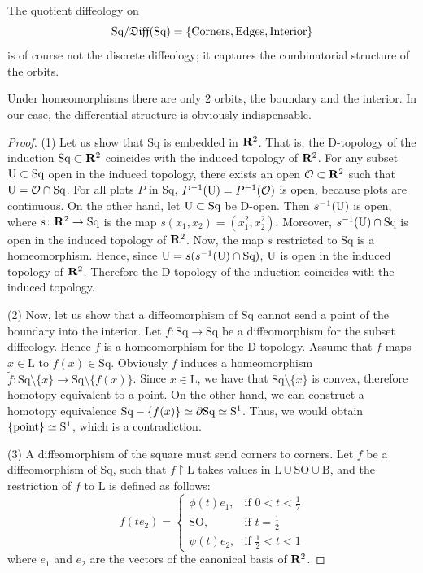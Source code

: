  The quotient diffeology on
$$\text{Sq}/\mathfrak{Diff}(\text{Sq}) = \{\text{Corners},\text{Edges},\text{Interior}\}$$
is of course not the discrete diffeology;
it captures the combinatorial structure of the orbits.

 Under homeomorphisms there are only $2$ orbits,
the boundary and the interior.
In our case,
the differential structure is obviously indispensable.

\begin{proof}
  (1) Let us show that $\text{Sq}$ is embedded in $\mathbf{R}^2$.
  That is,
  the D-topology of the induction $\text{Sq} \subset \mathbf{R}^2$ coincides with the induced topology of $\mathbf{R}^2$.
  For any subset $\mathrm{U} \subset \text{Sq}$ open in the induced topology,
  there exists an open $\mathcal{O} \subset \mathbf{R}^2$ such that $\mathrm{U} = \mathcal{O} \cap \text{Sq}$.
  For all plots $P$ in $\text{Sq}$,
  $P^{-1}(\mathrm{U}) = P^{-1}(\mathcal{O})$ is open,
  because plots are continuous.
  On the other hand,
  let $\mathrm{U} \subset \text{Sq}$ be D-open.
  Then $s^{-1}(\mathrm{U})$ is open,
  where $s \colon \mathbf{R}^2 \to \text{Sq}$ is the map $s(x_1,x_2) = (x_1^2, x_2^2)$.
  Moreover, $s^{-1}(\mathrm{U}) \cap \text{Sq}$ is open in the induced topology of $\mathbf{R}^2$.
  Now,
  the map $s$ restricted to $\text{Sq}$ is a homeomorphism.
  Hence,
  since $\mathrm{U} = s(s^{-1}(\mathrm{U}) \cap \text{Sq})$,
  $\mathrm{U}$ is open in the induced topology of $\mathbf{R}^2$.
  Therefore the D-topology of the induction coincides with the induced topology.
  
  (2) Now,
  let us show that a diffeomorphism of $\text{Sq}$ cannot send a point of the boundary into the interior.
  Let $f \colon \text{Sq} \to \text{Sq}$ be a diffeomorphism for the subset diffeology.
  Hence $f$ is a homeomorphism for the D-topology.
  Assume that $f$ maps $x \in \text{L}$ to $f(x) \in \mathring{\text{Sq}}$.
  Obviously $f$ induces a homeomorphism
  $\tilde{f} \colon \text{Sq} \setminus \{x\} \to \text{Sq} \setminus \{f(x)\}$.
  Since $x \in \text{L}$,
  we have that $\text{Sq} \setminus \{x\}$ is convex,
  therefore homotopy equivalent to a point.
  On the other hand,
  we can construct a homotopy equivalence
  $\text{Sq} - \{f(x)\} \simeq \partial \text{Sq} \simeq \mathrm{S}^1$.
  Thus,
  we would obtain $\{\text{point}\} \simeq \mathrm{S}^1$,
  which is a contradiction.
  
  (3) A diffeomorphism of the square must send corners to corners.
  Let $f$ be a diffeomorphism of $\text{Sq}$,
  such that $f \restriction \text{L}$ takes values in $\text{L} \cup \text{SO} \cup \text{B}$,
  and the restriction of $f$ to $\text{L}$ is defined as follows:
  $$
    f(t e_2) =
    \begin{cases}
      \phi(t) e_1, & \text{if } 0 < t < \frac{1}{2} \\
      \text{SO},   & \text{if } t = \frac{1}{2} \\
      \psi(t) e_2, & \text{if } \frac{1}{2} < t < 1
    \end{cases}
  $$
  where $e_1$ and $e_2$ are the vectors of the canonical basis of $\mathbf{R}^2$.
  

\end{proof}
